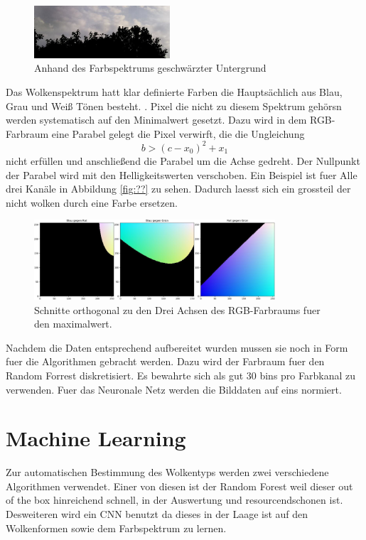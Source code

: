 \begin{figure}
		\centering
		\includegraphics[width=0.45\textwidth]{pictures/cut_out.pdf}
\caption{Anhand des Farbspektrums geschwärzter Untergrund}
\label{fig:}
\end{figure}
Das Wolkenspektrum hatt klar definierte Farben die Hauptsächlich aus Blau, Grau
und Weiß Tönen besteht. .
Pixel die nicht zu diesem Spektrum gehörsn werden systematisch auf den
Minimalwert gesetzt.
Dazu wird in dem RGB-Farbraum eine Parabel gelegt die Pixel verwirft, die die
Ungleichung 
\begin{equation}
		b > (c - x_0)^2 + x_1
\end{equation}
nicht erfüllen und anschließend die Parabel um die Achse gedreht.
Der Nullpunkt der Parabel wird mit den Helligkeitswerten verschoben.
Ein Beispiel ist fuer Alle  drei Kanäle in Abbildung \ref{fig:??} zu sehen.
Dadurch laesst sich ein grossteil der nicht wolken durch eine Farbe ersetzen.
\begin{figure}
		\centering
		\includegraphics[width=0.8\textwidth]{pictures/colorcube.pdf}
		\caption{Schnitte orthogonal zu den Drei Achsen des RGB-Farbraums fuer den maximalwert.}
		\label{fig:name}
\end{figure}

Nachdem die Daten entsprechend aufbereitet wurden mussen sie noch in Form fuer
die Algorithmen gebracht werden. 
Dazu wird der Farbraum fuer den Random Forrest diskretisiert.
Es bewahrte sich als gut 30 bins pro Farbkanal zu verwenden.
Fuer das Neuronale Netz werden die Bilddaten auf eins normiert.

\section{Machine Learning}

Zur automatischen Bestimmung des Wolkentyps werden zwei verschiedene Algorithmen
verwendet. 
Einer von diesen ist der Random Forest weil dieser out of the box hinreichend schnell,
in der Auswertung und resourcendschonen ist.
Desweiteren wird ein CNN benutzt da dieses in der Laage ist auf den Wolkenformen
sowie dem Farbspektrum zu lernen. 

